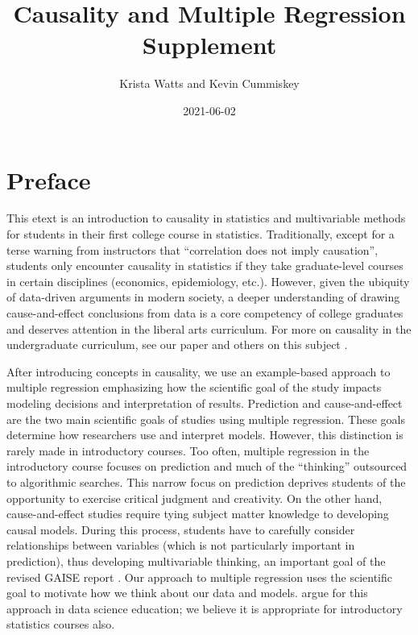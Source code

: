 \documentclass[
]{book}
\title{Causality and Multiple Regression Supplement}
\author{Krista Watts and Kevin Cummiskey}
\date{2021-06-02}
\begin{document}
\maketitle

{
\setcounter{tocdepth}{1}
\tableofcontents
}
\hypertarget{preface}{%
\chapter*{Preface}\label{preface}}

This etext is an introduction to causality in statistics and multivariable methods for students in their first college course in statistics. Traditionally, except for a terse warning from instructors that ``correlation does not imply causation'', students only encounter causality in statistics if they take graduate-level courses in certain disciplines (economics, epidemiology, etc.). However, given the ubiquity of data-driven arguments in modern society, a deeper understanding of drawing cause-and-effect conclusions from data is a core competency of college graduates and deserves attention in the liberal arts curriculum. For more on causality in the undergraduate curriculum, see our paper \citep{cummiskey2020causal} and others on this subject \citep{horton2015challenges, kaplan2018teaching, lubke2020we}.

After introducing concepts in causality, we use an example-based approach to multiple regression emphasizing how the scientific goal of the study impacts modeling decisions and interpretation of results. Prediction and cause-and-effect are the two main scientific goals of studies using multiple regression. These goals determine how researchers use and interpret models. However, this distinction is rarely made in introductory courses. Too often, multiple regression in the introductory course focuses on prediction and much of the ``thinking'' outsourced to algorithmic searches. This narrow focus on prediction deprives students of the opportunity to exercise critical judgment and creativity. On the other hand, cause-and-effect studies require tying subject matter knowledge to developing causal models. During this process, students have to carefully consider relationships between variables (which is not particularly important in prediction), thus developing multivariable thinking, an important goal of the revised GAISE report \citep{carver2016guidelines}. Our approach to multiple regression uses the scientific goal to motivate how we think about our data and models. \citet{hernan2019second} argue for this approach in data science education; we believe it is appropriate for introductory statistics courses also.
\end{document}
